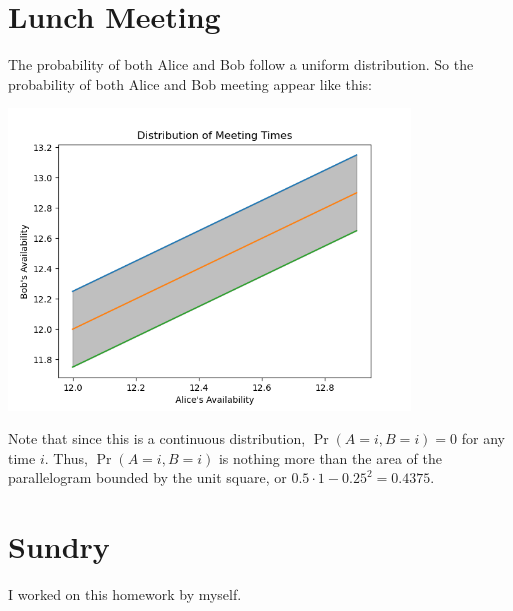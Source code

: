 \documentclass{article}
\begin{document}
\section{Lunch Meeting}

The probability of both Alice and Bob follow a uniform distribution.
So the probability of both Alice and Bob meeting appear like this:
\begin{center}
    \includegraphics[width=0.8\textwidth]{q4.png}
\end{center}
Note that since this is a continuous distribution, \(\Pr(A = i, B = i) = 0\) for any time \(i\).
Thus, \(\Pr(A = i, B = i)\) is nothing more than the area of the parallelogram bounded by the unit square, or \(0.5 \cdot 1 - 0.25^2 = \num{0.4375}\).

\section{Sundry}

I worked on this homework by myself.
\end{document}
